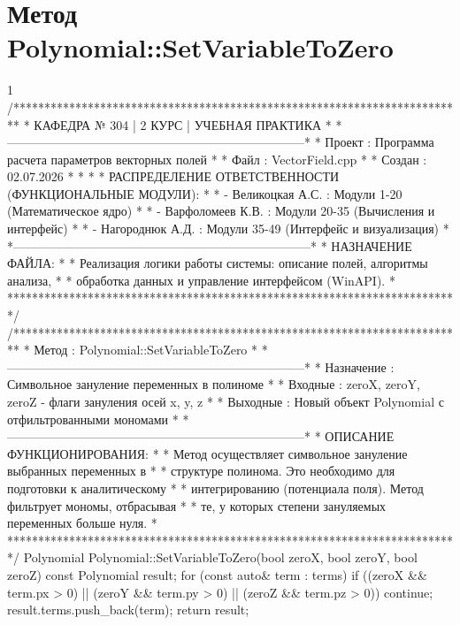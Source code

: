 \pagebreak

\section{Метод Polynomial::SetVariableToZero}
\footnotesize
\begin{listing}{1}
/*************************************************************************
* КАФЕДРА № 304 | 2 КУРС | УЧЕБНАЯ ПРАКТИКА                              *
*------------------------------------------------------------------------*
* Проект        : Программа расчета параметров векторных полей           *
* Файл          : VectorField.cpp                                        *
* Создан        : 02.07.2026                                             *
*                                                                        *
* РАСПРЕДЕЛЕНИЕ ОТВЕТСТВЕННОСТИ (ФУНКЦИОНАЛЬНЫЕ МОДУЛИ):                 *
* - Великоцкая А.С. : Модули 1-20 (Математическое ядро)                  *
* - Варфоломеев К.В. : Модули 20-35 (Вычисления и интерфейс)             *
* - Нагороднюк А.Д. : Модули 35-49 (Интерфейс и визуализация)            *
*------------------------------------------------------------------------*
* НАЗНАЧЕНИЕ ФАЙЛА:                                                      *
* Реализация логики работы системы: описание полей, алгоритмы анализа,   *
* обработка данных и управление интерфейсом (WinAPI).                    *
*************************************************************************/
/*************************************************************************
* Метод         : Polynomial::SetVariableToZero                          *
*------------------------------------------------------------------------*
* Назначение    : Символьное зануление переменных в полиноме             *
* Входные       : zeroX, zeroY, zeroZ - флаги зануления осей x, y, z     *
* Выходные      : Новый объект Polynomial с отфильтрованными мономами    *
*------------------------------------------------------------------------*
* ОПИСАНИЕ ФУНКЦИОНИРОВАНИЯ:                                             *
* Метод осуществляет символьное зануление выбранных переменных в         *
* структуре полинома. Это необходимо для подготовки к аналитическому     *
* интегрированию (потенциала поля). Метод фильтрует мономы, отбрасывая   *
* те, у которых степени зануляемых переменных больше нуля.               *
*************************************************************************/
Polynomial Polynomial::SetVariableToZero(bool zeroX, bool zeroY, 
                                         bool zeroZ) const {
    Polynomial result;
    for (const auto& term : terms) {
        if ((zeroX && term.px > 0) || (zeroY && term.py > 0) || 
            (zeroZ && term.pz > 0)) continue;
        result.terms.push_back(term);
    }
    return result;
}
\end{listing}
\normalsize

